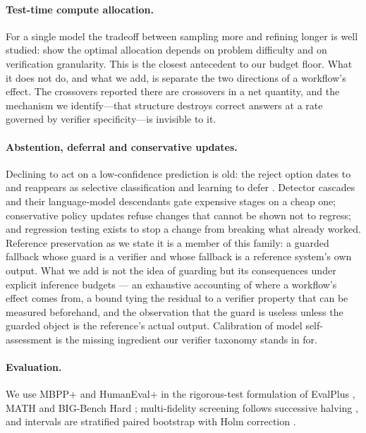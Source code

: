 \documentclass{article}
\begin{document}
\paragraph{Test-time compute allocation.} For a single model the tradeoff
between sampling more and refining longer is well studied:
\citet{snell2024scaling} show the optimal allocation depends on problem
difficulty and \citet{verification2025granularity} on verification granularity.
This is the closest antecedent to our budget floor. What it does not do, and
what we add, is separate the two directions of a workflow's effect. The
crossovers reported there are crossovers in a net quantity, and the mechanism we
identify---that structure destroys correct answers at a rate governed by
verifier specificity---is invisible to it.

\paragraph{Abstention, deferral and conservative updates.} Declining to act on
a low-confidence prediction is old: the reject option dates to
\citet{chow1970reject} and reappears as selective classification
\citep{geifman2017selective} and learning to defer
\citep{madras2018defer, mozannar2020defer}. Detector cascades
\citep{viola2001cascade} and their language-model descendants
\citep{chen2023frugalgpt} gate expensive stages on a cheap one; conservative
policy updates \citep{thomas2015safe, garcelon2020conservative} refuse changes
that cannot be shown not to regress; and regression testing
\citep{cohen1995regression} exists to stop a change from breaking what already
worked. Reference preservation as we state it is a member of this family: a
guarded fallback whose guard is a verifier and whose fallback is a reference
system's own output. What we add is not the idea of guarding but its
consequences under explicit inference budgets --- an exhaustive accounting of
where a workflow's effect comes from, a bound tying the residual to a verifier
property that can be measured beforehand, and the observation that the guard is
useless unless the guarded object is the reference's actual output.
Calibration of model self-assessment \citep{kadavath2022know} is the missing
ingredient our verifier taxonomy stands in for.

\paragraph{Evaluation.} We use MBPP+ and HumanEval+ \citep{austin2021mbpp,
chen2021humaneval} in the rigorous-test formulation of EvalPlus
\citep{liu2023evalplus}, MATH \citep{hendrycks2021math} and BIG-Bench Hard
\citep{suzgun2023bbh}; multi-fidelity screening follows successive halving
\citep{jamieson2016successive, li2018hyperband}, and intervals are stratified
paired bootstrap \citep{efron1994bootstrap} with Holm correction
\citep{holm1979}.
\end{document}
